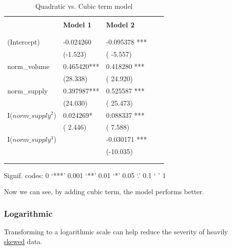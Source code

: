 \documentclass[12pt]{article}
\begin{document}
\begin{table}[h!]
\begin{center}
	
\begin{threeparttable}
		\caption{Quadratic vs. Cubic term model}			

\begin{tabular}{lllll}
\\ [-1.8ex]
\hline
\hline \\[-1.8ex]
 & {\textbf {Model 1}} & {\textbf {Model 2}}  \\
\\ [-1.8ex]
\hline \\[-1.8ex]


(Intercept)      	&-0.024260   			&-0.095378 ***	 \\
									&(-1.523)    			&( -5.557)    	\\
norm\_volume      & 0.465420***			& 0.418280 ***	 \\ 
									&(28.338)    			&( 24.920)    	\\
norm\_supply      & 0.397987***			& 0.525587 ***	 \\ 
									&(24.030)    			&( 25.473)    	\\
I($norm\_supply^2$) & 0.024269*  			& 0.088337 ***	 \\ 
									&( 2.446)    			&(  7.588)    	\\
I($norm\_supply^3$) &                 &-0.030171 ***	\\
				          &                 &(-10.035)    	\\


\\ [-1.8ex]
\hline \\[-1.8ex]

\end{tabular}
\begin{tablenotes}
\small
\item Signif. codes:  0 ‘***’ 0.001 ‘**’ 0.01 ‘*’ 0.05 ‘.’ 0.1 ‘ ’ 1\\
\end{tablenotes}

\end{threeparttable}
\end{center}
\end{table}



Now we can see, by adding cubic term, the model performs better.


\subsubsection{Logarithmic}
Transforming to a logarithmic scale can help reduce the severity of
heavily {\underline {skewed}} data.
\end{document}
